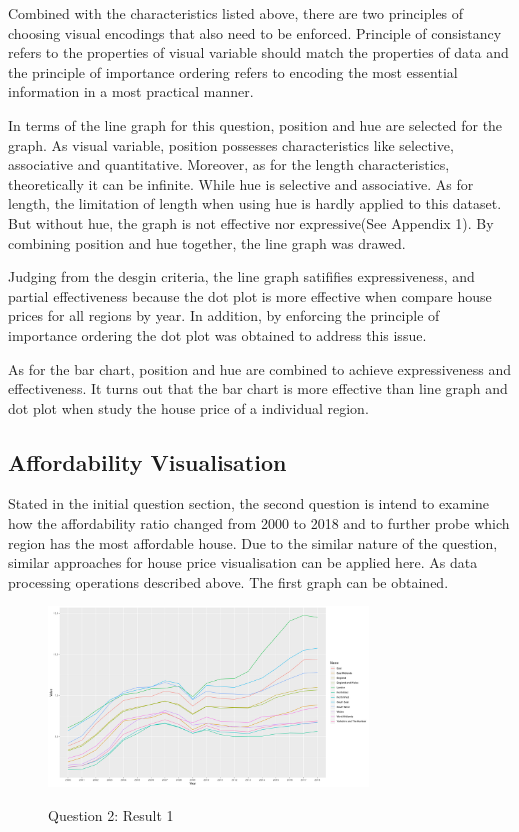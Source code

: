 \documentclass{article}
\begin{document}
Combined with the characteristics listed above, there are two principles of choosing visual encodings that 
also need to be enforced. Principle of consistancy refers to the properties of visual variable should match 
the properties of data and the principle of importance ordering refers to encoding the most essential information 
in a most practical manner.

In terms of the line graph for this question, position and hue are selected for the graph. As visual variable, 
position possesses characteristics like selective, associative and quantitative. Moreover, as for 
the length characteristics, theoretically it can be infinite. While hue is selective and associative. As for length, 
the limitation of length when using hue is hardly applied to this dataset. But without hue, the graph is not 
effective nor expressive(See Appendix 1). By combining position and hue together, the line graph was drawed. 

Judging from the desgin criteria, the line graph satififies expressiveness, and partial effectiveness because 
the dot plot is more effective when compare house prices for all regions by year. In addition, by enforcing 
the principle of importance ordering the dot plot was obtained to address this issue.

As for the bar chart, position and hue are combined to achieve expressiveness and effectiveness. It turns out 
that the bar chart is more effective than line graph and dot plot when study the house price of a individual region.




\subsection{Affordability Visualisation}
Stated in the initial question section, the second question is intend to examine how the affordability ratio changed from 2000 to 2018 
and to further probe which region has the most affordable house. Due to the similar nature of the question, 
similar approaches for house price visualisation can be applied here. As data processing operations described above. 
The first graph can be obtained.

\begin{figure}[H]
  \begin{minipage}[b]{1.0\linewidth}
    \centering
    \centerline{\includegraphics[width=8.5cm]{Q2Geom_line}}
    \centerline{Question 2: Result 1}\medskip
  \end{minipage}
\end{figure}
\end{document}
